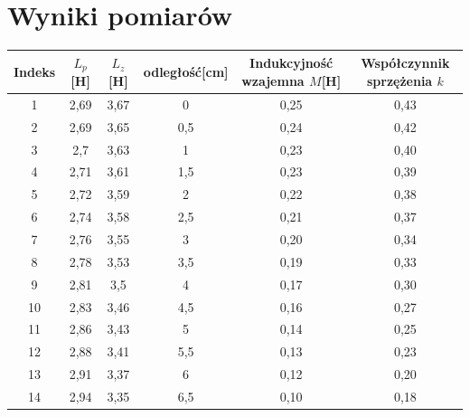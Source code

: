 \documentclass[a4paper,10pt,twoside]{article}
\begin{document}
	

	
	\section{Wyniki pomiarów}
	
\begin{table}[htb]
	\begin{tabular}{|c|c|c|c|c|c|}
		\hline
		Indeks & $L_p$ {[}H{]} & $L_z$ {[}H{]} & odległość[cm] & Indukcyjność wzajemna $M${[}H{]} & Współczynnik sprzężenia $k$ \\ \hline
		1      & 2,69       & 3,67 & 0       & 0,25                          & 0,43                      \\ \hline
		2      & 2,69       & 3,65 & 0,5     & 0,24                          & 0,42                      \\ \hline
		3      & 2,7        & 3,63 & 1       & 0,23                          & 0,40                      \\ \hline
		4      & 2,71       & 3,61 & 1,5     & 0,23                          & 0,39                      \\ \hline
		5      & 2,72       & 3,59 & 2       & 0,22                          & 0,38                      \\ \hline
		6      & 2,74       & 3,58 & 2,5     & 0,21                          & 0,37                      \\ \hline
		7      & 2,76       & 3,55 & 3       & 0,20                          & 0,34                      \\ \hline
		8      & 2,78       & 3,53 & 3,5     & 0,19                          & 0,33                      \\ \hline
		9      & 2,81       & 3,5  & 4       & 0,17                          & 0,30                      \\ \hline
		10     & 2,83       & 3,46 & 4,5     & 0,16                          & 0,27                      \\ \hline
		11     & 2,86       & 3,43 & 5       & 0,14                          & 0,25                      \\ \hline
		12     & 2,88       & 3,41 & 5,5     & 0,13                          & 0,23                      \\ \hline
		13     & 2,91       & 3,37 & 6       & 0,12                          & 0,20                      \\ \hline
		14     & 2,94       & 3,35 & 6,5     & 0,10                          & 0,18                      \\ \hline

\end{tabular}
\end{table}
\end{document}
